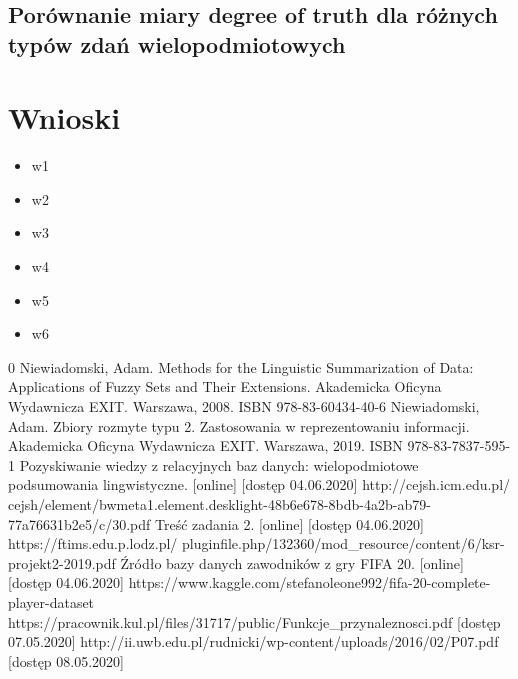\documentclass{classrep}
\begin{document}
	\subsection{Porównanie miary degree of truth dla różnych typów zdań wielopodmiotowych}
	
	\section{Wnioski}
	\begin{itemize}
		\item w1
		\item w2
		\item w3
		\item w4
		\item w5
		\item w6
	\end{itemize}

	
	\begin{thebibliography} {0}
		 Niewiadomski, Adam. Methods for the Linguistic Summarization of Data: Applications of Fuzzy Sets and Their Extensions. Akademicka Oficyna Wydawnicza EXIT. Warszawa, 2008. ISBN 978-83-60434-40-6
		 Niewiadomski, Adam. Zbiory rozmyte typu 2. Zastosowania w reprezentowaniu informacji. Akademicka Oficyna Wydawnicza EXIT. Warszawa, 2019. ISBN 978-83-7837-595-1
		 Pozyskiwanie wiedzy z relacyjnych baz danych: wielopodmiotowe podsumowania lingwistyczne. [online]  [dostęp 04.06.2020]
		http://cejsh.icm.edu.pl/
		cejsh/element/bwmeta1.element.desklight-48b6e678-8bdb-4a2b-ab79-
		77a76631b2e5/c/30.pdf
		 Treść zadania 2. [online] [dostęp 04.06.2020] https://ftims.edu.p.lodz.pl/
		pluginfile.php/132360/mod\_resource/content/6/ksr-projekt2-2019.pdf
		 Źródło bazy danych zawodników z gry FIFA 20. [online] [dostęp 04.06.2020] https://www.kaggle.com/stefanoleone992/fifa-20-complete-player-dataset
		 https://pracownik.kul.pl/files/31717/public/Funkcje\_przynaleznosci.pdf [dostęp 07.05.2020]
		 http://ii.uwb.edu.pl/rudnicki/wp-content/uploads/2016/02/P07.pdf [dostęp 08.05.2020]
	\end{thebibliography}
\end{document}
